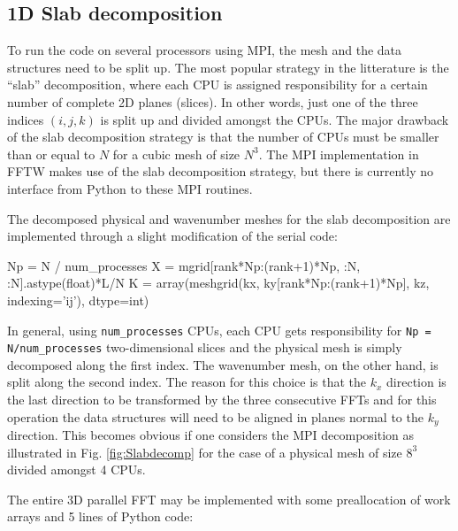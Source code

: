 \documentclass[11pt, oneside]{article}
\newcommand{\inpyth}{\lstinline[style=pythonstyle, basicstyle=\ttfamily]} %[]%
\begin{document}
\subsection{1D Slab decomposition}
\label{slab1D}

To run the code on several processors using MPI, the mesh and the data structures need to be split up. The most popular strategy in the litterature is the ``slab'' decomposition, where each CPU is assigned responsibility for a certain number of complete 2D planes (slices). In other words, just one of the three indices $(i,j,k)$ is split up and divided amongst the CPUs. The major drawback of the slab decomposition strategy is that the number of CPUs must be smaller than or equal to $N$ for a cubic mesh of size $N^3$. The MPI implementation in FFTW makes use of the slab decomposition strategy, but there is currently no interface from Python to these MPI routines.

The decomposed physical and wavenumber meshes for the slab decomposition are implemented through a slight modification of the serial code:

\begin{python}
Np = N / num_processes
X = mgrid[rank*Np:(rank+1)*Np, :N, :N].astype(float)*L/N
K = array(meshgrid(kx, ky[rank*Np:(rank+1)*Np], kz, 
                   indexing='ij'), dtype=int)
\end{python}
In general, using \inpyth{num_processes} CPUs, each CPU gets responsibility for \inpyth{Np = N/num_processes} two-dimensional slices and the physical mesh is simply decomposed along the first index. The wavenumber mesh, on the other hand, is split along the second index. The reason for this choice is that the $k_x$ direction is the last direction to be transformed by the three consecutive FFTs and for this operation the data structures will need to be aligned in planes normal to the $k_y$ direction. This becomes obvious if one considers the MPI decomposition as illustrated in Fig. \ref{fig:Slabdecomp} for the case of a physical mesh of size $8^3$ divided amongst 4 CPUs.

The entire 3D parallel FFT may be implemented with some preallocation of work arrays and 5 lines of Python code:
\end{document}
